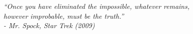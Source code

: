 \begin{epigrafe}
    \vspace*{\fill}
	\begin{flushright}
		\textit{
		``Once you have eliminated the impossible, whatever remains,\\
		 however improbable, must be the truth.''\\
		\-- Mr. Spock, Star Trek (2009)	
		}
	\end{flushright}
\end{epigrafe}
